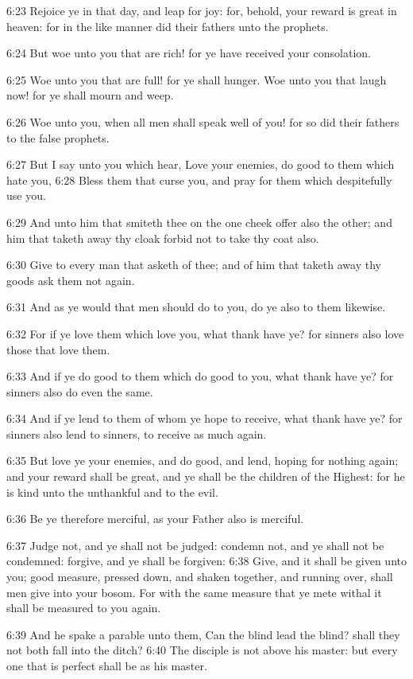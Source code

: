 6:23 Rejoice ye in that day, and leap for joy: for, behold, your reward is great in heaven: for in the like manner did their fathers unto the prophets.

6:24 But woe unto you that are rich! for ye have received your consolation.

6:25 Woe unto you that are full! for ye shall hunger. Woe unto you that laugh now! for ye shall mourn and weep.

6:26 Woe unto you, when all men shall speak well of you! for so did their fathers to the false prophets.

6:27 But I say unto you which hear, Love your enemies, do good to them which hate you, 6:28 Bless them that curse you, and pray for them which despitefully use you.

6:29 And unto him that smiteth thee on the one cheek offer also the other; and him that taketh away thy cloak forbid not to take thy coat also.

6:30 Give to every man that asketh of thee; and of him that taketh away thy goods ask them not again.

6:31 And as ye would that men should do to you, do ye also to them likewise.

6:32 For if ye love them which love you, what thank have ye? for sinners also love those that love them.

6:33 And if ye do good to them which do good to you, what thank have ye?  for sinners also do even the same.

6:34 And if ye lend to them of whom ye hope to receive, what thank have ye? for sinners also lend to sinners, to receive as much again.

6:35 But love ye your enemies, and do good, and lend, hoping for nothing again; and your reward shall be great, and ye shall be the children of the Highest: for he is kind unto the unthankful and to the evil.

6:36 Be ye therefore merciful, as your Father also is merciful.

6:37 Judge not, and ye shall not be judged: condemn not, and ye shall not be condemned: forgive, and ye shall be forgiven: 6:38 Give, and it shall be given unto you; good measure, pressed down, and shaken together, and running over, shall men give into your bosom. For with the same measure that ye mete withal it shall be measured to you again.

6:39 And he spake a parable unto them, Can the blind lead the blind?  shall they not both fall into the ditch?  6:40 The disciple is not above his master: but every one that is perfect shall be as his master.

